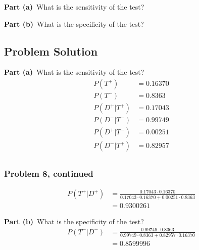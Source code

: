 \documentclass[12pt]{article}
\theoremstyle{definition}
\begin{document}
\bigskip
\noindent
{\bf Part (a)}\ What is the sensitivity of the test?

\bigskip
\noindent
{\bf Part (b)}\ What is the specificity of the test?


\subsection*{Problem Solution}

\noindent
{\bf Part (a)}\ What is the sensitivity of the test?
\begin{align*}
P(T^+) &= 0.16370\\
P(T^-) &= 0.8363\\
P(D^+|T^+) &= 0.17043\\
P(D^-|T^-) &= 0.99749\\
P(D^+|T^-) &= 0.00251\\
P(D^-|T^+) &= 0.82957\\
\end{align*}


\newpage
\subsubsection*{Problem 8, continued}
\begin{align*}
P(T^+|D^+) &= \frac{0.17043 \cdot 0.16370}{0.17043 \cdot 0.16370 + 0.00251 \cdot 0.8363}\\
&= 0.9300261
\end{align*}

{\bf Part (b)}\ What is the specificity of the test?
\begin{align*}
P(T^-|D^-) &= \frac{0.99749 \cdot 0.8363}{0.99749 \cdot 0.8363 + 0.82957 \cdot 0.16370}\\
&= 0.8599996
\end{align*}
\end{document}
